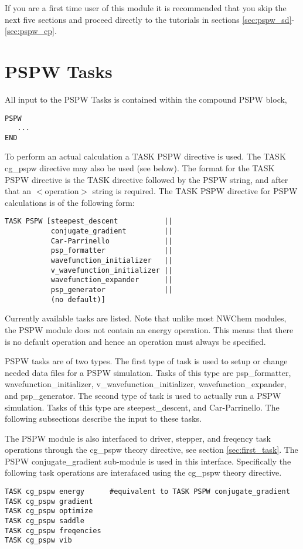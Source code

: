 If you are a first time user of this module it is recommended that you skip
the next five sections and proceed directly to the tutorials in sections 
\ref{sec:pspw_sd}-\ref{sec:pspw_cp}.

\section{PSPW Tasks}
\label{sec:pspw_tasks}

All input to the PSPW Tasks is contained within the compound PSPW  block,
\begin{verbatim}
PSPW
   ...
END
\end{verbatim}

To perform an actual calculation a TASK PSPW directive is used.  The TASK
cg\_pspw directive may also be used (see below).  The format for the 
TASK PSPW directive is the TASK directive followed by the 
PSPW string, and after that an $<$operation$>$ string is required.  The 
TASK PSPW directive for PSPW calculations is of the following form:
\begin{verbatim}
TASK PSPW [steepest_descent           ||
           conjugate_gradient         ||
           Car-Parrinello             ||
           psp_formatter              ||
           wavefunction_initializer   ||
           v_wavefunction_initializer ||
           wavefunction_expander      ||
           psp_generator              ||
           (no default)]
\end{verbatim}
Currently available tasks are listed.  Note that unlike most 
NWChem modules, the PSPW module does not contain an energy operation.  
This means that there is no default operation and hence an operation must 
always be specified. 



PSPW tasks are of two types.  The first type of 
task is used to setup or change needed data files for a 
PSPW simulation.  Tasks of this type are psp\_formatter, 
wavefunction\_initializer, v\_wavefunction\_initializer, 
wavefunction\_expander, and psp\_generator.  The second type 
of task is used to actually run a PSPW simulation.  Tasks 
of this type are steepest\_descent, and Car-Parrinello.
The following subsections describe the input to these tasks.

The PSPW module is also interfaced to driver, stepper, and freqency task 
operations through the cg\_pspw theory directive, see 
section \ref{sec:first_task}. The PSPW conjugate\_gradient sub-module is used
in this interface.  Specifically the following task operations 
are interafaced using the cg\_pspw theory directive.
\begin{verbatim}
TASK cg_pspw energy      #equivalent to TASK PSPW conjugate_gradient           
TASK cg_pspw gradient         
TASK cg_pspw optimize         
TASK cg_pspw saddle           
TASK cg_pspw freqencies       
TASK cg_pspw vib
\end{verbatim}


